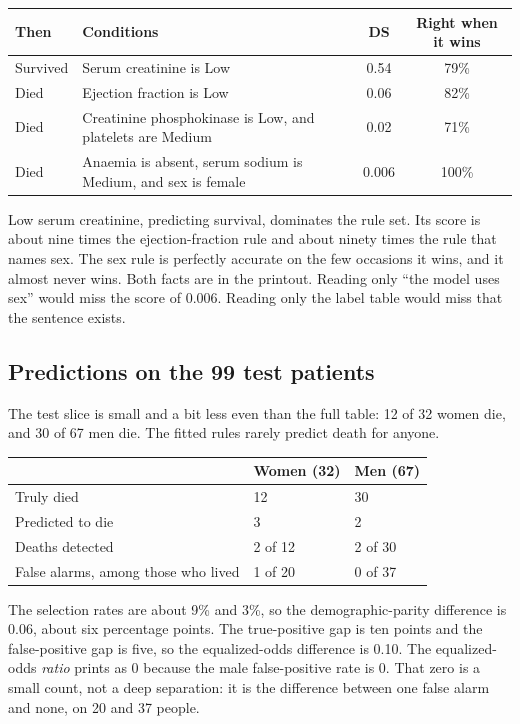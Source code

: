 \documentclass[11pt]{article}
\newcommand{\pct}[1]{\mbox{#1\%}}
\begin{document}
\begin{table}[H]
\centering
\small
\begin{tabularx}{\textwidth}{@{}l Y c c@{}}
\toprule
Then & Conditions & DS & Right when it wins \\
\midrule
{}
Survived & Serum creatinine is Low & 0.54 & \pct{79} \\
Died & Ejection fraction is Low & 0.06 & \pct{82} \\
Died & Creatinine phosphokinase is Low, and platelets are Medium & 0.02 & \pct{71} \\
Died & Anaemia is absent, serum sodium is Medium, and sex is female & 0.006 & \pct{100} \\
\bottomrule
\end{tabularx}
\end{table}

Low serum creatinine, predicting survival, dominates the rule set. Its score is about nine times the ejection-fraction rule and about ninety times the rule that names sex. The sex rule is perfectly accurate on the few occasions it wins, and it almost never wins. Both facts are in the printout. Reading only ``the model uses sex'' would miss the score of 0.006. Reading only the label table would miss that the sentence exists.

\subsection{Predictions on the 99 test patients}

The test slice is small and a bit less even than the full table: 12 of 32 women die, and 30 of 67 men die. The fitted rules rarely predict death for anyone.

\begin{table}[H]
\centering
\small
\begin{tabularx}{\textwidth}{@{}l Y Y@{}}
\toprule
 & Women (32) & Men (67) \\
\midrule
Truly died & 12 & 30 \\
Predicted to die & 3 & 2 \\
Deaths detected & 2 of 12 & 2 of 30 \\
False alarms, among those who lived & 1 of 20 & 0 of 37 \\
\bottomrule
\end{tabularx}
\end{table}

The selection rates are about \pct{9} and \pct{3}, so the demographic-parity difference is 0.06, about six percentage points. The true-positive gap is ten points and the false-positive gap is five, so the equalized-odds difference is 0.10. The equalized-odds \emph{ratio} prints as 0 because the male false-positive rate is 0. That zero is a small count, not a deep separation: it is the difference between one false alarm and none, on 20 and 37 people.
\end{document}
